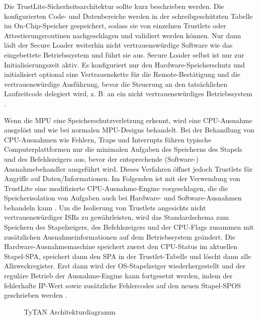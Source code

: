 Die TrustLite-Sicherheitsarchitektur sollte kurz beschrieben werden. Die konfigurierten Code- und Datenbereiche werden in der schreibgeschützten Tabelle im On-Chip-Speicher gespeichert, sodass sie von einzelnen Trustlets oder Attestierungsroutinen nachgeschlagen und validiert werden können. Nur dann lädt der Secure Loader weiterhin nicht vertrauenswürdige Software wie das eingebettete Betriebssystem und führt sie aus. Secure Loader selbst ist nur zur Initialisierungszeit aktiv. Es konfiguriert nur den Hardware-Speicherschutz und initialisiert optional eine Vertrauenskette für die Remote-Bestätigung und die vertrauenswürdige Ausführung, bevor die Steuerung an den tatsächlichen Laufzeitcode delegiert wird, z. B. an ein nicht vertrauenswürdiges Betriebssystem \cite[p.4]{website:TrustLite}. 

Wenn die MPU eine Speicherschutzverletzung erkennt, wird eine CPU-Ausnahme ausgelöst und wie bei normalen MPU-Designs behandelt. Bei der Behandlung von CPU-Ausnahmen wie Fehlern, Traps und Interrupts führen typische Computerplattformen nur die minimalen Aufgaben des Speicherns des Stapels und des Befehlszeigers aus, bevor der entsprechende (Software-) Ausnahmebehandler ausgeführt wird. Dieses Verfahren öffnet jedoch Trustlets für Angriffe auf Daten/Informationen. Im Folgenden ist mit der Verwendung von TrustLite eine modifizierte CPU-Ausnahme-Engine vorgeschlagen, die die Speicherisolation von Aufgaben auch bei Hardware- und Software-Ausnahmen behandeln kann \cite[p.6]{website:TrustLite}. Um die Isolierung von Trustlets angesichts nicht vertrauenswürdiger ISRs zu gewährleisten, wird das Standardschema zum Speichern des Stapelzeigers, des Befehlszeigers und der CPU-Flags zusammen mit zusätzlichen Ausnahmeinformationen auf dem Betriebssystem geändert. Die Hardware-Ausnahmemaschine speichert zuerst den CPU-Status im aktuellen Stapel-SPA, speichert dann den SPA in der Trustlet-Tabelle und löscht dann alle Allzweckregister. Erst dann wird der OS-Stapelzeiger wiederhergestellt und der reguläre Betrieb der Ausnahme-Engine kann fortgesetzt werden, indem der fehlerhafte IP-Wert sowie zusätzliche Fehlercodes auf den neuen Stapel-SPOS geschrieben werden \cite[p.9]{website:TrustLite}.

\begin{figure}[h!]
	\centering
	\caption{TyTAN Architekturdiagramm}
	\label{fig:tyt_arch}
\end{figure}

